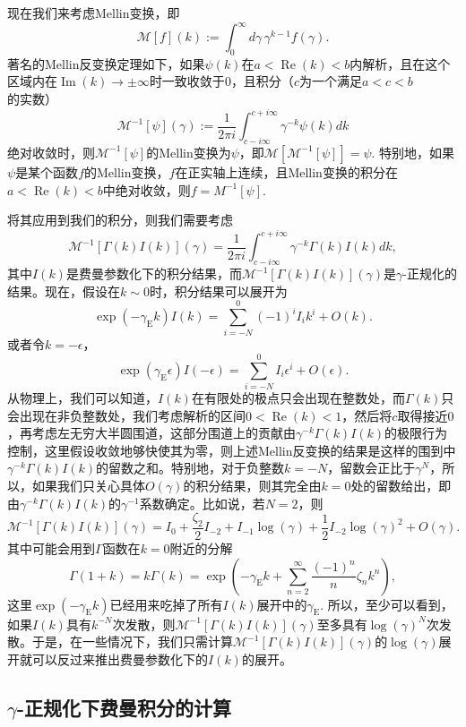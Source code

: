 \documentclass[12pt]{article}
\theoremstyle{definition}
\theoremstyle{plain}
\begin{document}
现在我们来考虑Mellin变换，即
\[
	\mathcal M[f](k):=\int_0^\infty d\gamma\, \gamma^{k-1} f(\gamma).
\]
著名的Mellin反变换定理如下，如果$\psi(k)$在$a<\operatorname{Re}(k)<b$内解析，且在这个区域内在$\operatorname{Im}(k)\to \pm \infty$时一致收敛于$0$，且积分（$c$为一个满足$a<c<b$的实数）
\[
	\mathcal M^{-1}[\psi](\gamma):=\frac{1}{2\pi i}\int_{c-i\infty}^{c+i\infty}\gamma^{-k}\psi(k)dk
\]
绝对收敛时，则$\mathcal M^{-1}[\psi]$的Mellin变换为$\psi$，即$\mathcal M[\mathcal M^{-1}[\psi]]=\psi$. 特别地，如果$\psi$是某个函数$f$的Mellin变换，$f$在正实轴上连续，且Mellin变换的积分在$a<\operatorname{Re}(k)<b$中绝对收敛，则$f=M^{-1}[\psi]$.

将其应用到我们的积分，则我们需要考虑
\[
	\mathcal M^{-1}[\Gamma(k)I(k)](\gamma)=\frac{1}{2\pi i}\int_{c-i\infty}^{c+i\infty}\gamma^{-k}\Gamma(k)I(k)dk,
\]
其中$I(k)$是费曼参数化下的积分结果，而$\mathcal M^{-1}[\Gamma(k)I(k)](\gamma)$是$\gamma$-正规化的结果。现在，假设在$k\sim 0$时，积分结果可以展开为
\[
	\exp (-\gamma_{\mathrm{E}} k)I(k)=\sum_{i=-N}^0 (-1)^iI_i k^i+O(k).
\]
或者令$k=-\epsilon$，
\[
	\exp (\gamma_{\mathrm{E}} \epsilon)I(-\epsilon)=\sum_{i=-N}^0 I_i \epsilon^i+O(\epsilon).
\]
从物理上，我们可以知道，$I(k)$在有限处的极点只会出现在整数处，而$\Gamma(k)$只会出现在非负整数处，我们考虑解析的区间$0<\operatorname{Re}(k)<1$，然后将$c$取得接近$0$，再考虑左无穷大半圆围道，这部分围道上的贡献由$\gamma^{-k}\Gamma(k)I(k)$的极限行为控制，这里假设收敛地够快使其为零，则上述Mellin反变换的结果是这样的围到中$\gamma^{-k}\Gamma(k)I(k)$的留数之和。特别地，对于负整数$k=-N$，留数会正比于$\gamma^N$，所以，如果我们只关心具体$O(\gamma)$的积分结果，则其完全由$k=0$处的留数给出，即由$\gamma^{-k}\Gamma(k)I(k)$的$\gamma^{-1}$系数确定。比如说，若$N=2$，则
\[
	\mathcal M^{-1}[\Gamma(k)I(k)](\gamma)=I_0+\frac{\zeta_2}{2}I_{-2}+I_{-1}\log(\gamma)+\frac{1}{2}I_{-2}\log(\gamma)^2 + O(\gamma).
\]
其中可能会用到$\Gamma$函数在$k=0$附近的分解
\[
	\Gamma(1+k)=k\Gamma(k)=\exp \left(-\gamma_{\mathrm{E}} k+\sum_{n=2}^{\infty} \frac{(-1)^{n}}{n} \zeta_{n} k^{n}\right),
\]
这里$\exp (-\gamma_{\mathrm{E}} k)$已经用来吃掉了所有$I(k)$展开中的$\gamma_{\mathrm{E}}$. 所以，至少可以看到，如果$I(k)$具有$k^{-N}$次发散，则$\mathcal M^{-1}[\Gamma(k)I(k)](\gamma)$至多具有$\log(\gamma)^N$次发散。于是，在一些情况下，我们只需计算$\mathcal M^{-1}[\Gamma(k)I(k)](\gamma)$的$\log(\gamma)$展开就可以反过来推出费曼参数化下的$I(k)$的展开。

\subsection{$\gamma$-正规化下费曼积分的计算}
\end{document}
